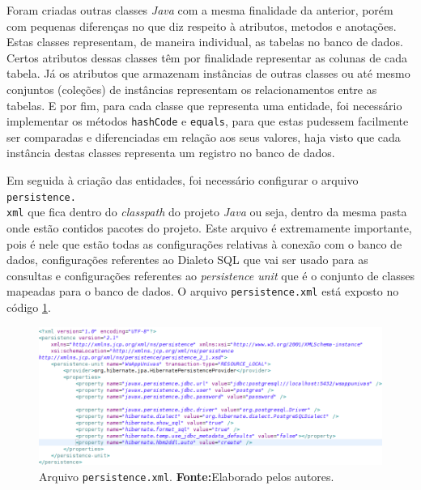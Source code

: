 		\pagebreak
		
	\par Foram criadas outras classes \textit{Java} com a mesma finalidade da
anterior, porém com pequenas diferenças no que diz respeito à atributos,
metodos e anotações. Estas classes representam, de maneira individual, as
tabelas no banco de dados. Certos atributos dessas classes têm por finalidade
representar as colunas de cada tabela. Já os atributos que armazenam instâncias
de outras classes ou até mesmo conjuntos (coleções) de instâncias representam
os relacionamentos entre as tabelas. E por fim, para cada classe que representa
uma entidade, foi necessário implementar os métodos \texttt{hashCode} e
\texttt{equals}, para que estas pudessem facilmente ser comparadas e
diferenciadas em relação aos seus valores, haja visto que cada instância destas
classes representa um registro no banco de dados.
\overfullrule=2cm		
	\par Em seguida à criação das entidades, foi necessário configurar o arquivo
\texttt{persistence.\\xml} que fica dentro do \textit{classpath} do projeto
\textit{Java} ou seja, dentro da mesma pasta onde estão contidos pacotes do
projeto. Este arquivo é extremamente importante, pois é nele que estão todas as
configurações relativas à conexão com o banco de dados, configurações
referentes ao Dialeto SQL que vai ser usado para as consultas e configurações
referentes ao \textit{persistence unit} que é o conjunto de classes mapeadas
para o banco de dados.	O arquivo \texttt{persistence.xml} está exposto no
código \ref{fig:qm11}.
	
 		\begin{figure}[h!]
			\centerline{\includegraphics[scale=0.6]{./imagens/2_q_metodologico/qm11.png}}
			\caption[Arquivo \texttt{persistence.xml}]{Arquivo \texttt{persistence.xml}.
			\textbf{Fonte:}Elaborado pelos autores.}
			\label{fig:qm11}
		\end{figure}
		
